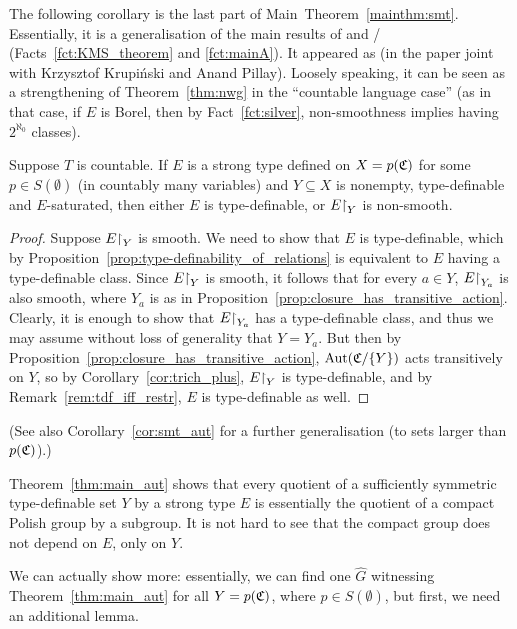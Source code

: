 	The following corollary is the last part of Main~Theorem~\ref{mainthm:smt}. Essentially, it is a generalisation of the main results of \cite{KMS14} and \cite{KM14}/\cite{KR16} (Facts~\ref{fct:KMS_theorem} and \ref{fct:mainA}). It appeared as \cite[Theorem 4.1]{KPR15} (in the paper joint with Krzysztof Krupiński and Anand Pillay). Loosely speaking, it can be seen as a strengthening of Theorem~\ref{thm:nwg} in the ``countable language case'' (as in that case, if $E$ is Borel, then by Fact~\ref{fct:silver}, non-smoothness implies having $2^{\aleph_0}$ classes).
	\begin{cor}
		\label{cor:smt_type}
		Suppose $T$ is countable. If $E$ is a strong type defined on $X=p({\mathfrak C})$ for some $p\in S(\emptyset)$ (in countably many variables) and $Y\subseteq X$ is nonempty, type-definable and $E$-saturated, then either $E$ is type-definable, or $E\mathord{\upharpoonright}_Y$ is non-smooth.
	\end{cor}
	\begin{proof}
		Suppose $E\mathord{\upharpoonright}_Y$ is smooth. We need to show that $E$ is type-definable, which by Proposition~\ref{prop:type-definability_of_relations} is equivalent to $E$ having a type-definable class. Since $E\mathord{\upharpoonright}_{Y}$ is smooth, it follows that for every $a\in Y$, $E\mathord{\upharpoonright}_{Y_a}$ is also smooth, where $Y_a$ is as in Proposition~\ref{prop:closure_has_transitive_action}. Clearly, it is enough to show that $E\mathord{\upharpoonright}_{Y_a}$ has a type-definable class, and thus we may assume without loss of generality that $Y=Y_a$. But then by Proposition~\ref{prop:closure_has_transitive_action}, $\operatorname{{Aut}}({\mathfrak C}/\{Y\})$ acts transitively on $Y$, so by Corollary~\ref{cor:trich_plus}, $E\mathord{\upharpoonright}_{Y}$ is type-definable, and by Remark~\ref{rem:tdf_iff_restr}, $E$ is type-definable as well.
	\end{proof}
	(See also Corollary~\ref{cor:smt_aut} for a further generalisation (to sets larger than $p({\mathfrak C})$).)
	
	Theorem~\ref{thm:main_aut} shows that every quotient of a sufficiently symmetric type-definable set $Y$ by a strong type $E$ is essentially the quotient of a compact Polish group by a subgroup. It is not hard to see that the compact group does not depend on $E$, only on $Y$.
	
	We can actually show more: essentially, we can find one $\hat G$ witnessing Theorem~\ref{thm:main_aut} for all $Y=p({\mathfrak C})$, where $p\in S(\emptyset)$, but first, we need an additional lemma.
	
